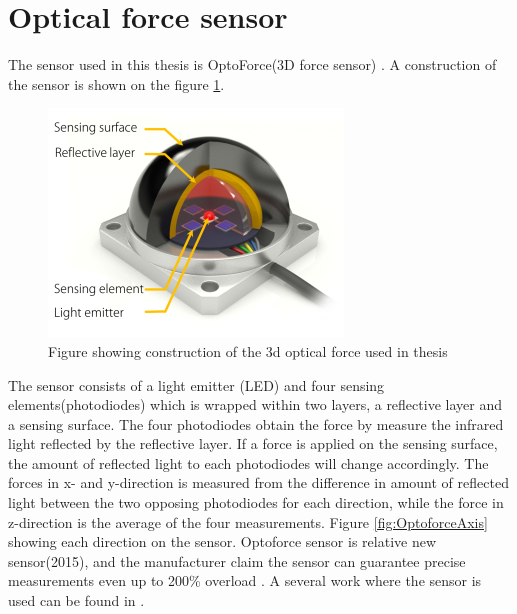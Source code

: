\documentclass[USenglish]{ifimaster}  %
\begin{document}
\section{Optical force sensor}
The sensor used in this thesis is OptoForce(3D force sensor) \cite{Optoforce}. A construction of the sensor is shown on the figure \ref{fig:OptoforceBuild}. 
\begin{figure}[h]
	\centering
	\includegraphics[scale=0.8]{Figures/OptoforceBuild}
	\caption{Figure showing construction of the 3d optical force used in thesis \cite{OptoforceFig}}
	\label{fig:OptoforceBuild}
\end{figure}
\FloatBarrier

The sensor consists of a light emitter (LED) and four sensing elements(photodiodes) which is wrapped within two layers, a reflective layer and a sensing surface. The four photodiodes obtain the force by measure the infrared light reflected by the reflective layer. If a force is applied on the sensing surface, the amount of reflected light to each photodiodes will change accordingly. The forces in x- and y-direction is measured from the difference in amount of reflected light between the two opposing photodiodes for each direction, while the force in z-direction is the average of the four measurements. Figure \ref{fig:OptoforceAxis} showing each direction on the sensor. Optoforce sensor is relative new sensor(2015), and the manufacturer claim the sensor can guarantee precise measurements even up to 200\% overload \cite{Optoforce2}. A several work where the sensor is used can be found in \cite{7803326,7759112,7849467}.
\end{document}
